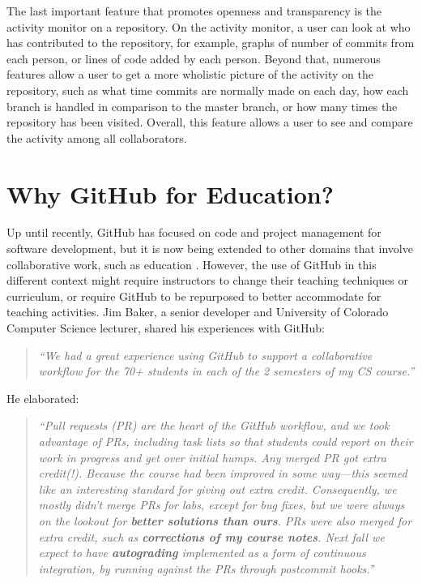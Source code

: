 The last important feature that promotes openness and transparency is the activity monitor on a repository. On the activity monitor, a user can look at who has contributed to the repository, for example, graphs of number of commits from each person, or lines of code added by each person. Beyond that, numerous features allow a user to get a more wholistic picture of the activity on the repository, such as what time commits are normally made on each day, how each branch is handled in comparison to the master branch, or how many times the repository has been visited. Overall, this feature allows a user to see and compare the activity among all collaborators.

\section{Why GitHub for Education?}
Up until recently, GitHub has focused on code and project management for software development, but it is now being extended to other domains that involve collaborative work, such as education \cite{Griffin:2013:GCJ:2458539.2458551}. However, the use of GitHub in this different context might require instructors to change their teaching techniques or curriculum, or require GitHub to be repurposed to better accommodate for teaching activities. Jim Baker, a senior developer and University of Colorado Computer Science lecturer, shared his experiences with GitHub: \begin{quote}\textit{``We had a great experience using GitHub to support a collaborative workflow for the 70+ students in each of the 2 semesters of my CS course.''}\end{quote} He elaborated: \begin{quote}\textit{``Pull requests (PR) are the heart of the GitHub workflow, and we took advantage of PRs, including task lists so that students could report on their work in progress and get over initial humps. Any merged PR got extra credit(!). Because the course had been improved in some way---this seemed like an interesting standard for giving out extra credit. Consequently, we mostly didn't merge PRs for labs, except for bug fixes, but we were always on the lookout for \textbf{better solutions than ours}. PRs were also merged for extra credit, such as \textbf{corrections of my course notes}. Next fall we expect to have \textbf{autograding} implemented as a form of continuous integration, by running against the PRs through postcommit hooks.''}\end{quote}

